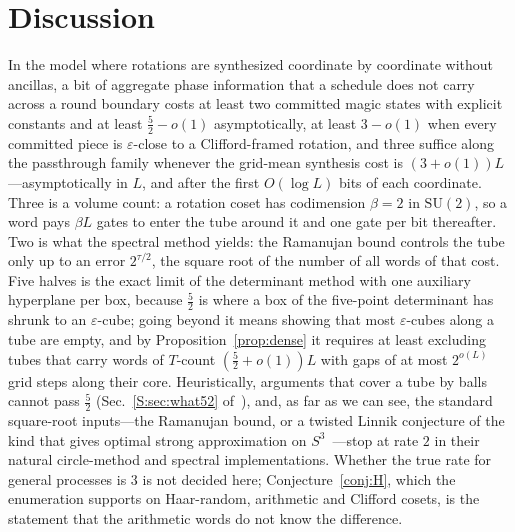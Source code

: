 \documentclass[aps,prx,twocolumn,superscriptaddress,nofootinbib,longbibliography]{revtex4-2}
\theoremstyle{plain}
\theoremstyle{definition}
\theoremstyle{remark}
\newcommand{\SU}{\mathrm{SU}(2)}
\begin{document}
\section{Discussion}\label{sec:disc}

In the model where rotations are synthesized coordinate by coordinate without ancillas, a bit of aggregate phase information that a schedule does not carry across a round boundary costs at least two committed magic states with explicit constants and at least $\tfrac52-o(1)$ asymptotically, at least $3-o(1)$ when every committed piece is $\varepsilon$-close to a Clifford-framed rotation, and three suffice along the passthrough family whenever the grid-mean synthesis cost is $(3+o(1))L$---asymptotically in $L$, and after the first $O(\log L)$ bits of each coordinate. Three is a volume count: a rotation coset has codimension $\beta=2$ in $\SU$, so a word pays $\beta L$ gates to enter the tube around it and one gate per bit thereafter. Two is what the spectral method yields: the Ramanujan bound controls the tube only up to an error $2^{\tau/2}$, the square root of the number of all words of that cost. Five halves is the exact limit of the determinant method with one auxiliary hyperplane per box, because $\tfrac52$ is where a box of the five-point determinant has shrunk to an $\varepsilon$-cube; going beyond it means showing that most $\varepsilon$-cubes along a tube are empty, and by Proposition~\ref{prop:dense} it requires at least excluding tubes that carry words of $T$-count $(\tfrac52+o(1))L$ with gaps of at most $2^{o(L)}$ grid steps along their core. Heuristically, arguments that cover a tube by balls cannot pass $\tfrac52$ (Sec.~\ref{S:sec:what52} of~\cite{SM}), and, as far as we can see, the standard square-root inputs---the Ramanujan bound, or a twisted Linnik conjecture of the kind that gives optimal strong approximation on $S^3$~\cite{BKS}---stop at rate $2$ in their natural circle-method and spectral implementations. Whether the true rate for general processes is $3$ is not decided here; Conjecture~\ref{conj:H}, which the enumeration supports on Haar-random, arithmetic and Clifford cosets, is the statement that the arithmetic words do not know the difference.
\end{document}
